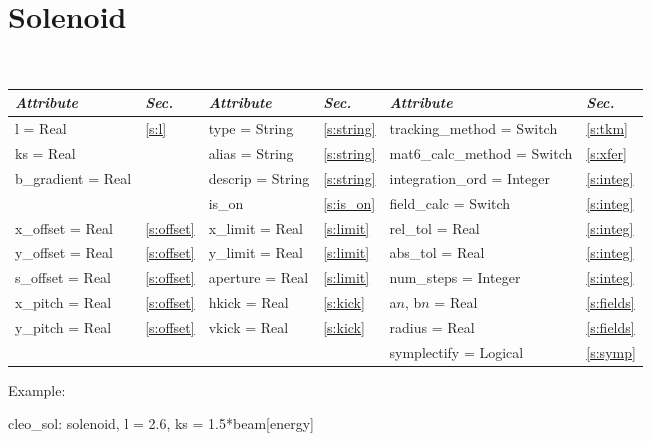 \section{Solenoid}
\label{s:sol}

\toffset
\begin{center}
\tt
\begin{tabular}{|l|l||l|l||l|l|} \hline
  {\sl Attribute} & {\sl Sec.}  & {\sl Attribute} & {\sl Sec.} & {\sl Attribute} & {\sl Sec.} \\ \hline
  l        = Real       & \ref{s:l}      & type = String      & \ref{s:string} & tracking\_method = Switch   & \ref{s:tkm}   \\ \hline
  ks       = Real       &                & alias = String     & \ref{s:string} & mat6\_calc\_method = Switch & \ref{s:xfer}  \\ \hline
  b\_gradient = Real    &                & descrip = String   & \ref{s:string} & integration\_ord = Integer  & \ref{s:integ} \\ \hline
                        &                & is\_on             & \ref{s:is_on}  & field\_calc = Switch        & \ref{s:integ} \\ \hline
  x\_offset  = Real     & \ref{s:offset} & x\_limit = Real    & \ref{s:limit}  & rel\_tol = Real             & \ref{s:integ} \\ \hline
  y\_offset  = Real     & \ref{s:offset} & y\_limit = Real    & \ref{s:limit}  & abs\_tol = Real             & \ref{s:integ} \\ \hline
  s\_offset  = Real     & \ref{s:offset} & aperture = Real    & \ref{s:limit}  & num\_steps = Integer        & \ref{s:integ} \\ \hline
  x\_pitch = Real       & \ref{s:offset} & hkick    = Real    & \ref{s:kick}   & a$n$, b$n$ = Real           & \ref{s:fields}\\ \hline
  y\_pitch = Real       & \ref{s:offset} & vkick    = Real    & \ref{s:kick}   & radius = Real               & \ref{s:fields}\\ \hline
                        &                &                    &                & symplectify = Logical       & \ref{s:symp}  \\ \hline
\end{tabular}
\end{center}
\toffset

\vskip0.05in \noindent
Example:
\begin{example}
  cleo_sol: solenoid, l = 2.6, ks = 1.5*beam[energy]
\end{example}

